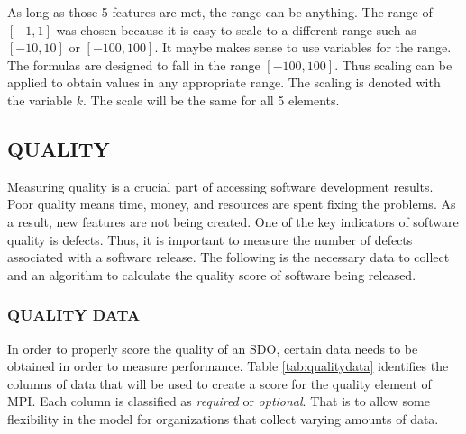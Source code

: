 \documentclass[SDSUThesis.tex]{subfiles}
\begin{document}
    As long as those 5 features are met, the range can be anything.  
    The range of $[-1,1]$ was chosen because it is easy to scale 
    to a different range such as $[-10,10]$ or $[-100,100]$.  
    It maybe makes sense to use variables for the range.  
    The formulas are designed to fall in the range $[-100,100]$.  
    Thus scaling can be applied to obtain values in any appropriate range. 
    The scaling is denoted with the variable $k$.  The scale will be the same
    for all 5 elements.
        
\subsection{QUALITY}
    Measuring quality is a crucial part of accessing 
    software development results.  
    Poor quality means time, money, and resources are spent 
    fixing the problems. As a result, new features are not being
    created. One of the key indicators of software quality 
    is defects.  Thus, it is important
    to measure the number of defects associated with a software 
    release.  The following is the necessary data to collect
    and an algorithm to calculate
    the quality score of software being released. 
    
    \subsubsection{QUALITY DATA}
        In order to properly score the quality of an SDO,
        certain data needs to be obtained in order to measure
        performance. Table \ref{tab:qualitydata} identifies
        the columns of data that will be used to create
        a score for the quality element of MPI.  
        Each column is classified as \textit{required} or
        \textit{optional}.  That is to allow some flexibility
        in the model for organizations that collect
        varying amounts of data.
        
\end{document}
